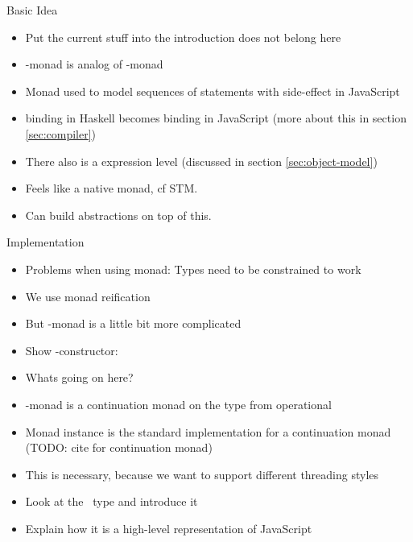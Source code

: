 Basic Idea
\begin{itemize}
\item Put the current stuff into the introduction does not belong here
\item \JS-monad is analog of \IO-monad
\item Monad used to model sequences of statements with side-effect in 
JavaScript \cite{Moggi:91:ComputationMonads}
\item binding in Haskell becomes binding in JavaScript (more about this in section \ref{sec:compiler})
\item There also is a expression level (discussed in section \ref{sec:object-model})
\item Feels like a native monad, cf STM.
\item Can build abstractions on top of this.
\end{itemize}
Implementation
\begin{itemize}
\item Problems when using monad: Types need to be constrained to work
\item We use monad reification \cite{Apfelmus:10:Operational,Hackage:10:Operational}
\item But \JS-monad is a little bit more complicated
\item Show \JS-constructor: 
\item Whats going on here?
\item \JS-monad is a continuation monad on the  type from operational
\item Monad instance is the standard implementation for a continuation 
monad (TODO: cite for continuation monad)
\item This is necessary, because we want to support different threading styles
\item Look at the \JSI\ type and introduce it
\item Explain how it is a high-level representation of JavaScript
\end{itemize}




